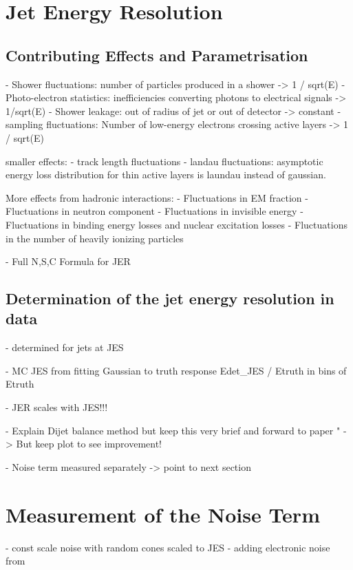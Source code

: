 \section{Jet Energy Resolution}


\subsection{Contributing Effects and Parametrisation}
- Shower fluctuations: number of particles produced in a shower -> 1 / sqrt(E)
- Photo-electron statistics: inefficiencies converting photons to electrical signals -> 1/sqrt(E)
- Shower leakage: out of radius of jet or out of detector  -> constant 
- sampling fluctuations: Number of low-energy electrons crossing active layers -> 1 / sqrt(E)

smaller effects:
- track length fluctuations
- landau fluctuations: asymptotic energy loss distribution for thin active layers is laundau instead of gaussian. 

More effects from hadronic interactions:
- Fluctuations in EM fraction
- Fluctuations in neutron component
- Fluctuations in invisible energy
- Fluctuations in binding energy losses and nuclear excitation losses
- Fluctuations in the number of heavily ionizing particles

- Full N,S,C Formula for JER


\subsection{Determination of the jet energy resolution in data}

- determined for jets at JES

- MC JES from fitting Gaussian to truth response Edet_JES / Etruth in bins of Etruth

- JER scales with JES!!!

- Explain Dijet balance method but keep this very brief and forward to paper "
-> But keep plot to see improvement!

- Noise term measured separately -> point to next section


\section{Measurement of the Noise Term}

- const scale noise with random cones scaled to JES 
- adding electronic noise from 

